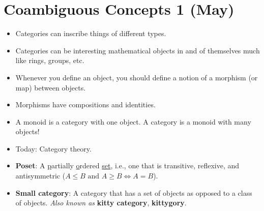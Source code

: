 \documentclass[../apprentice.tex]{subfiles}
\begin{document}
\section{Coambiguous Concepts 1 (May)}
\begin{itemize}
    \item Categories can inscribe things of different types.
    \item Categories can be interesting mathematical objects in and of themselves much like rings, groups, etc.
    \item Whenever you define an object, you should define a notion of a morphism (or map) between objects.
    \item Morphisms have compositions and identities.
    \item A monoid is a category with one object. A category is a monoid with many objects!
    \item Today: Category theory.
    \item \textbf{Poset}: A \underline{p}artially \underline{o}rdered \underline{set}, i.e., one that is transitive, reflexive, and antisymmetric ($A\leq B\text{ and }A\geq B\Longleftrightarrow A=B$).
    \item \textbf{Small category}: A category that has a set of objects as opposed to a class of objects. \emph{Also known as} \textbf{kitty category}, \textbf{kittygory}.
\end{itemize}
\end{document}
